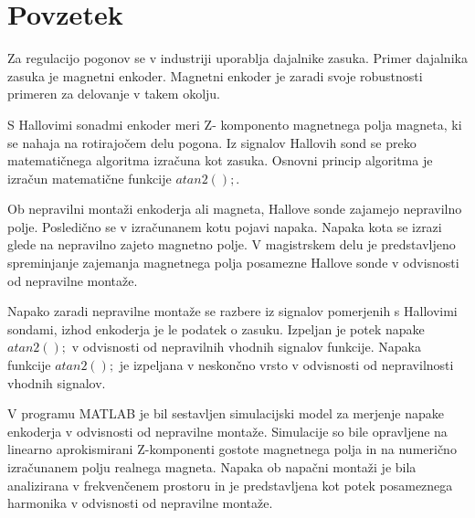 \documentclass[a4paper,twoside,openright,12pt]{book}
\begin{document}
\chapter*{Povzetek}


Za regulacijo pogonov se v industriji uporablja dajalnike zasuka.
Primer dajalnika zasuka je magnetni enkoder.
Magnetni enkoder je zaradi svoje robustnosti primeren za delovanje v takem okolju.

S Hallovimi sonadmi enkoder meri Z- komponento magnetnega polja magneta, ki se nahaja na rotirajočem delu pogona.
Iz signalov Hallovih sond se preko matematičnega algoritma izračuna kot zasuka.
Osnovni princip algoritma je izračun matematične funkcije $atan2();$.

Ob nepravilni montaži enkoderja ali magneta, Hallove sonde zajamejo nepravilno polje. Posledično se v izračunanem kotu pojavi napaka.
Napaka kota se izrazi glede na nepravilno zajeto magnetno polje. V magistrskem delu je predstavljeno spreminjanje zajemanja magnetnega polja posamezne Hallove sonde v odvisnosti od nepravilne montaže.

Napako zaradi nepravilne montaže se razbere iz signalov pomerjenih s Hallovimi sondami, izhod enkoderja je le podatek o zasuku.
Izpeljan je potek napake  $atan2();$ v odvisnosti od nepravilnih vhodnih signalov funkcije. Napaka funkcije $atan2();$  je izpeljana v neskončno vrsto v odvisnosti od nepravilnosti vhodnih signalov.

V programu MATLAB je bil sestavljen simulacijski model za merjenje napake enkoderja v odvisnosti od nepravilne montaže.
Simulacije so bile opravljene na linearno aprokismirani Z-komponenti gostote magnetnega polja in na numerično izračunanem polju realnega magneta.
Napaka ob napačni montaži je bila analizirana v frekvenčenem prostoru in je predstavljena kot potek posameznega harmonika v odvisnosti od nepravilne montaže.
\end{document}
